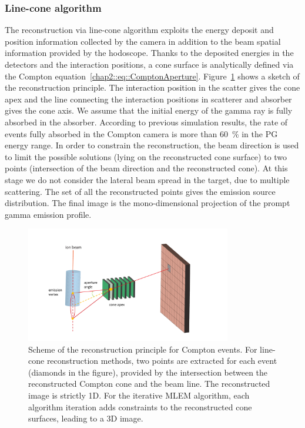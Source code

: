 \subsubsection{Line-cone algorithm}\label{chap4::subsubsec::line_cone}
The reconstruction via line-cone algorithm exploits the energy deposit and position information collected by the camera in addition to the beam spatial information provided by the hodoscope. Thanks to the deposited energies in the detectors and the interaction positions, a cone surface is analytically defined via the Compton equation~\ref{chap2::eq::ComptonAperture}. Figure~\ref{chap4::fig::fig:reconstruction_scheme} shows a sketch of the reconstruction principle. The interaction position in the scatter gives the cone apex and the line connecting the interaction positions in scatterer and absorber gives the cone axis. We assume that the initial energy of the gamma ray is fully absorbed in the absorber. According to previous simulation results, the rate of events fully absorbed in the Compton camera is more than 60~\% in the PG energy range. In order to constrain the reconstruction, the beam direction is used to limit the possible solutions (lying on the reconstructed cone surface) to two points (intersection of the beam direction and the reconstructed cone). At this stage we do not consider the lateral beam spread in the target, due to multiple scattering. The set of all the reconstructed points gives the emission source distribution. The final image is the mono-dimensional projection of the prompt gamma emission profile. 

\begin{figure}
\centering
  \includegraphics[width=0.8\textwidth]{03_GraphicFiles/chapter4_HTsimu/reconstruction_scheme}
  \caption{Scheme of the reconstruction principle for Compton events. For line-cone reconstruction methods, two points are extracted for each event (diamonds in the figure), provided by the intersection between the reconstructed Compton cone and the beam line. The reconstructed image is strictly 1D. For the iterative MLEM algorithm, each algorithm iteration adds constraints to the reconstructed cone surfaces, leading to  a 3D image.}	
  \label{chap4::fig::fig:reconstruction_scheme}
\end{figure}

